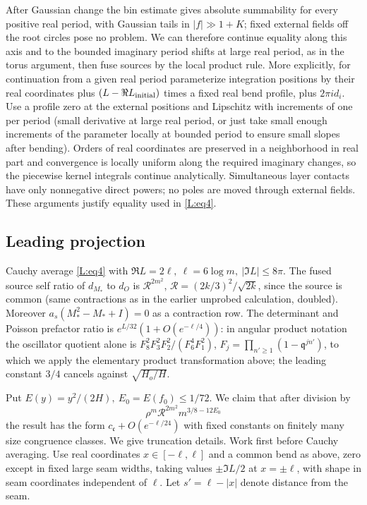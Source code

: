 \documentclass[11pt]{article}
\numberwithin{equation}{section}
\theoremstyle{definition}\newtheorem{definition}[theorem]{Definition}
\theoremstyle{remark}\newtheorem{remark}[theorem]{Remark}
\begin{document}
After Gaussian change the bin estimate gives absolute summability for every positive real period, with Gaussian tails in \(|f|\gg 1+K\); fixed external fields off the root circles pose no problem. We can therefore continue equality along this axis and to the bounded imaginary period shifts at large real period, as in the torus argument, then fuse sources by the local product rule. More explicitly, for continuation from a given real period parameterize integration positions by their real coordinates plus \((L-\Re L_{\rm initial})\) times a fixed real bend profile, plus \(2\pi i d_i\). Use a profile zero at the external positions and Lipschitz with increments of one per period (small derivative at large real period, or just take small enough increments of the parameter locally at bounded period to ensure small slopes after bending). Orders of real coordinates are preserved in a neighborhood in real part and convergence is locally uniform along the required imaginary changes, so the piecewise kernel integrals continue analytically. Simultaneous layer contacts have only nonnegative direct powers; no poles are moved through external fields. These arguments justify equality used in \eqref{L:eq4}.

\subsection{Leading projection}\label{L:step12}

Cauchy average \eqref{L:eq4} with \(\Re L=2\ell,\ \ell=6\log m,\ |\Im L|\le8\pi\). The fused source self ratio of \(d_{M_*}\) to \(d_O\) is \(\mathcal R^{2m^2}\), \(\mathcal R=(2k/3)^2/\sqrt{2k}\), since the source is common (same contractions as in the earlier unprobed calculation, doubled). Moreover \(a_s(M_*^2-M_*+I)=0\) as a contraction row. The determinant and Poisson prefactor ratio is \(e^{L/32}(1+O(e^{-\ell/4}))\): in angular product notation the oscillator quotient alone is \(F_8^2F_3^2F_2^2/(F_6^4F_1^2)\), \(F_j=\prod_{n'\ge1}(1-\mathfrak q^{j n'})\), to which we apply the elementary product transformation above; the leading constant \(3/4\) cancels against \(\sqrt{H_o/H}\).

Put \(E(y)=y^2/(2H),\ E_0=E(f_0)\le1/72\). We claim that after division by
\[
 \rho^m\mathcal R^{2m^2} m^{3/8-12E_0}
\]
the result has the form \(c_{\mathfrak c}+O(e^{-\ell/24})\) with fixed constants on finitely many size congruence classes. We give truncation details. Work first before Cauchy averaging. Use real coordinates \(x\in[-\ell,\ell]\) and a common bend as above, zero except in fixed large seam widths, taking values \(\pm\Im L/2\) at \(x=\pm\ell\), with shape in seam coordinates independent of \(\ell\). Let \(s'=\ell-|x|\) denote distance from the seam.
\end{document}
